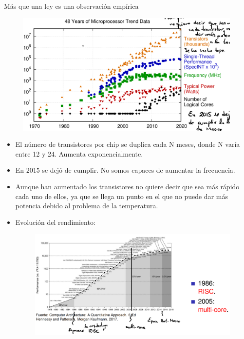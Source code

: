 \documentclass[12pt, twoside, openright]{report} %
\begin{document}
  Más que una ley es una observación empírica
  \begin{figure}[H]
    {\includegraphics[scale=.2]{Untitled.png}}
  \end{figure}
  \begin{itemize}
  \item
    El número de transistores por chip se duplica cada N meses, donde N
    varía entre 12 y 24. Aumenta exponencialmente.
  \item
    En 2015 se dejó de cumplir. No somos capaces de aumentar la
    frecuencia.
  \item
    Aunque han aumentado los transistores no quiere decir que sea más
    rápido cada uno de ellos, ya que se llega un punto en el que no
    puede dar más potencia debido al problema de la temperatura.
  \item
    Evolución del rendimiento:
    \begin{figure}[H]
      {\includegraphics[scale=.35]{Untitled 1.png}}
    \end{figure}
  \end{itemize}
\end{document}
